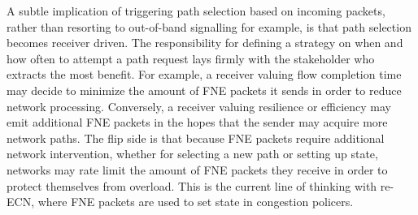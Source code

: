 A subtle implication of triggering path selection based on incoming packets, rather than resorting to out-of-band signalling for example, is that path selection becomes receiver driven. 
The responsibility for defining a strategy on when and how often to attempt a path request lays firmly with the stakeholder who extracts the most benefit. 
For example, a receiver valuing flow completion time may decide to minimize the amount of \ac{FNE} packets it sends in order to reduce network processing.
Conversely, a receiver valuing resilience or efficiency may emit additional \ac{FNE} packets in the hopes that the sender may acquire more network paths.
The flip side is that because \ac{FNE} packets require additional network intervention, whether for selecting a new path or setting up state, networks may rate limit the amount of \ac{FNE} packets they receive in order to protect themselves from overload. 
This is the current line of thinking with re-\ac{ECN}, where \ac{FNE} packets are used to set state in congestion policers.

